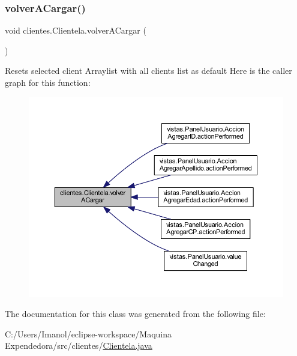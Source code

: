 \subsubsection{\texorpdfstring{volver\+A\+Cargar()}{volverACargar()}}
{\footnotesize\ttfamily void clientes.\+Clientela.\+volver\+A\+Cargar (\begin{DoxyParamCaption}{ }\end{DoxyParamCaption})}

Resets selected client Arraylist with all clients list as default Here is the caller graph for this function\+:\nopagebreak
\begin{figure}[H]
\begin{center}
\leavevmode
\includegraphics[width=350pt]{classclientes_1_1_clientela_a99c3c767c734c205696aaf32131e0119_icgraph}
\end{center}
\end{figure}


The documentation for this class was generated from the following file\+:\begin{DoxyCompactItemize}
\item 
C\+:/\+Users/\+Imanol/eclipse-\/workspace/\+Maquina Expendedora/src/clientes/\mbox{\hyperlink{_clientela_8java}{Clientela.\+java}}\end{DoxyCompactItemize}
